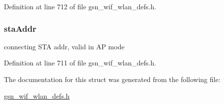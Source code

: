 Definition at line 712 of file gsn\_\-wif\_\-wlan\_\-defs.h.

\hypertarget{a00373_a3ca54ba7eb6c301c5b6584284a9ccb8b}{
\subsubsection[{staAddr}]{ {\bf staAddr}}}
\label{a00373_a3ca54ba7eb6c301c5b6584284a9ccb8b}
connecting STA addr, valid in AP mode 

Definition at line 711 of file gsn\_\-wif\_\-wlan\_\-defs.h.



The documentation for this struct was generated from the following file:\begin{DoxyCompactItemize}
\item 
\hyperlink{a00613}{gsn\_\-wif\_\-wlan\_\-defs.h}\end{DoxyCompactItemize}
